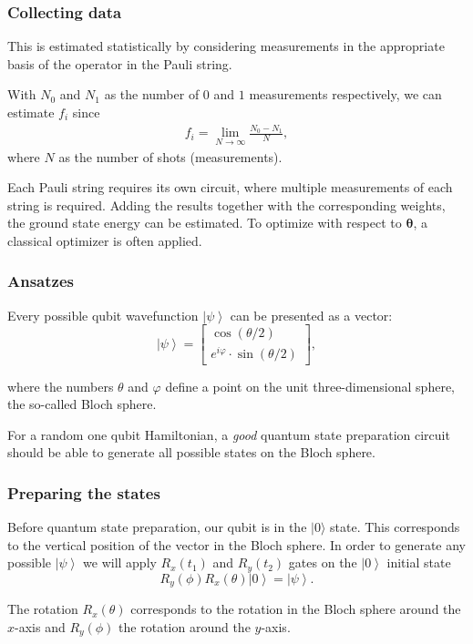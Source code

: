 \documentclass{beamer}
\begin{document}
\begin{frame}
\frametitle{Collecting data}

This is estimated statistically by considering measurements in the
appropriate basis of the operator in the Pauli string.

With $N_0$ and $N_1$ as the number of $0$ and $1$ measurements respectively, we can estimate $f_i$ since 
\begin{align*}
    f_i = \lim_{N \to \infty} \frac{N_0 - N_1}{N},
\end{align*}
where $N$ as the number of shots (measurements).

Each Pauli string requires its own circuit, where multiple measurements
of each string is required. Adding the results together with the
corresponding weights, the ground state energy can be estimated. To
optimize with respect to  $\boldsymbol{\theta}$, a classical optimizer is often
applied.
\end{frame}

\begin{frame}
\frametitle{Ansatzes}

Every possible qubit wavefunction $\left| \psi \right\rangle$ can be presented as a vector: 
\[
\left| \psi \right\rangle = \begin{bmatrix}
\cos{\left( \theta/2 \right)}\\
e^{i \varphi} \cdot \sin{\left( \theta/2 \right)}
\end{bmatrix},
\]

where the numbers $\theta$ and $\varphi$ define a point on the unit
three-dimensional sphere, the so-called  Bloch sphere.

For a random one qubit Hamiltonian, a \emph{good} quantum state preparation
circuit should be able to generate all possible states on the Bloch
sphere.
\end{frame}

\begin{frame}
\frametitle{Preparing the states}

Before quantum state preparation, our qubit is in the $\vert 0\rangle$ state.
This corresponds to the vertical position of
the vector in the Bloch sphere. In order to generate any possible
$\left| \psi \right\rangle$ we will apply $R_x(t_1)$ and $R_y(t_2)$
gates on the $\left| 0 \right\rangle$ initial state
\[
R_y(\phi)R_x(\theta) \left| 0 \right\rangle = \left| \psi\right\rangle.
\]

The rotation $R_x(\theta)$
corresponds to the rotation in the Bloch
sphere around the $x$-axis and $R_y(\phi)$ the rotation around the $y$-axis.
\end{frame}
\end{document}
